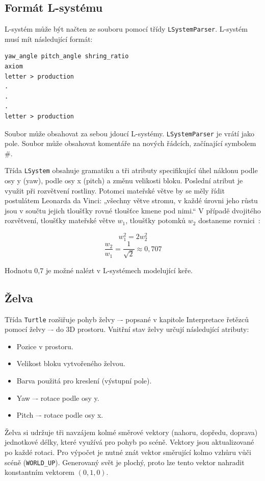 \documentclass[thesis=M,czech]{FITthesis}[2019/12/23]
\begin{document}
\subsection{Formát L-systému}

L-systém může být načten ze souboru pomocí třídy \texttt{LSystemParser}. L-systém musí mít následující formát:

\begin{verbatim}
yaw_angle pitch_angle shring_ratio
axiom
letter > production
.
.
.
letter > production
\end{verbatim}

Soubor může obsahovat za sebou jdoucí L-systémy. \texttt{LSystemParser} je vrátí jako pole. Soubor může obsahovat komentáře na nových řádcích, začínající symbolem \#.

Třída \texttt{LSystem} obsahuje gramatiku a tři atributy specifikující úhel náklonu podle osy y (yaw), podle osy x (pitch) a změnu velikosti bloku. Poslední atribut je využit při rozvětvení rostliny. Potomci mateřské větve by se měly řídit postulátem Leonarda da Vinci: „všechny větve stromu, v každé úrovni jeho růstu jsou v součtu jejich tloušťky rovné tloušťce kmene pod nimi.“ V případě dvojitého rozvětvení, tloušťky mateřské větve $w_1$, tloušťky potomků $w_2$ dostaneme rovnici~\cite{abop57}:

\[ w_1^2 = 2w_2^2 \]
\[ \frac{w_2}{w_1} = \frac{1}{\sqrt{2}} \approx 0,707\]

Hodnotu 0,7 je možné nalézt v L-systémech modelující keře.

\subsection{Želva}
Třída \texttt{Turtle} rozšiřuje pohyb želvy –- popsané v kapitole Interpretace řetězců pomocí želvy –- do 3D prostoru. Vnitřní stav želvy určují následující atributy:

\begin{itemize}
\item Pozice v prostoru.
\item Velikost bloku vytvořeného želvou.
\item Barva použitá pro kreslení (výstupní pole).
\item Yaw –- rotace podle osy y.
\item Pitch –- rotace podle osy x.
\end{itemize}

Želva si udržuje tři navzájem kolmé směrové vektory (nahoru, dopředu, doprava) jednotkové délky, které využívá pro pohyb po scéně. Vektory jsou aktualizované po každé rotaci. Pro výpočet je nutné znát vektor směrující kolmo vzhůru vůči scéně (\texttt{WORLD\_UP}). Generovaný svět je plochý, proto lze tento vektor nahradit konstantním vektorem $(0, 1, 0)$.
\end{document}
